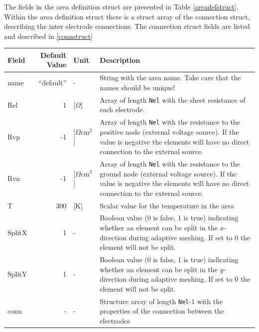 \documentclass[noshowpacs,preprintnumbers,amsmath,amssymb, letter]{revtex4}
\begin{document}
The fields in the area definition struct are presented in Table \ref{areadefstruct}. Within the area definition struct there is a struct array of the connection struct, describing the inter electrode connections. The connection struct fields are listed and described in \ref{connstruct}
\begin{table}[H]
\caption{\label{areadefstruct}The fields in the area definition struct}
\begin{longtable}{lrlp{}}
Field & Default Value & Unit & Description\\
\hline
name 	& ``default'' 	& - 						& String with the area name. Take care that the names should be unique!\\
Rel	 	&  1 			& [$\Omega$] 				& Array of length \texttt{Nel} with the sheet resistance of each electrode.\\
Rvp	 	&  -1 			& [$\Omega \text{cm}^2$] 	& Array of length \texttt{Nel} with the resistance to the positive node (external voltage source). If the value is negative the elements will have no direct connection to the external source.\\
Rvn	 	&  -1 			& [$\Omega \text{cm}^2$] 	& Array of length \texttt{Nel} with the resistance to the ground node (external voltage source). If the value is negative the elements will have no direct connection to the external source.\\
T		&	300			& [K]						& Scalar value for the temperature in the area\\
SplitX	&	1			& -							& Boolean value (0 is false, 1 is true) indicating whether an element can be split in the $x$-direction during adaptive meshing. If set to 0 the element will not be split.\\
SplitY	&	1			& -							& Boolean value (0 is false, 1 is true) indicating whether an element can be split in the $y$-direction during adaptive meshing. If set to 0 the element will not be split.\\
conn	&	-			& -							& Structure array of length \texttt{Nel}-1 with the properties of the connection between the electrodes
\end{longtable}


\end{table}
\end{document}
